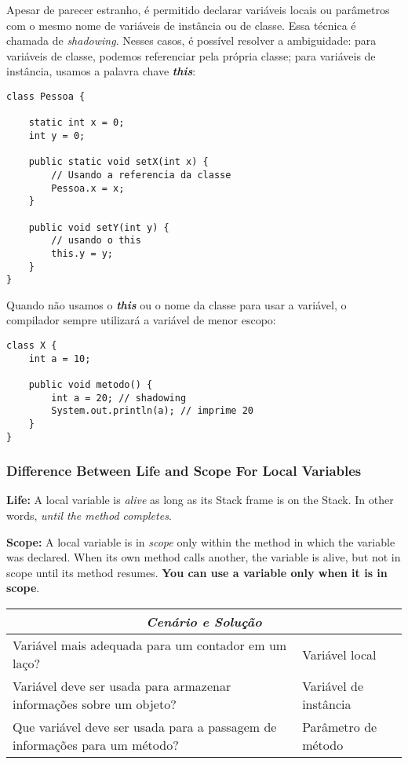 \documentclass[12pt]{article}
\begin{document}
Apesar de parecer estranho, é permitido declarar variáveis locais ou parâmetros com o mesmo nome de variáveis de instância ou de classe. Essa técnica é chamada de \textit{shadowing}. Nesses casos, é possível resolver a ambiguidade: para variáveis de classe, podemos referenciar pela própria classe; para variáveis de instância, usamos a palavra chave \textbf{\textit{this}}:

\begin{lstlisting}
class Pessoa {
	
	static int x = 0;
	int y = 0;
	
	public static void setX(int x) {
		// Usando a referencia da classe
		Pessoa.x = x;
	}
	
	public void setY(int y) {
		// usando o this
		this.y = y;
	}
}
\end{lstlisting}
\pagebreak
Quando não usamos o \textbf{\textit{this}} ou o nome da classe para usar a variável, o compilador sempre utilizará a variável de menor escopo:

\begin{lstlisting}
class X {
	int a = 10;
	
	public void metodo() {
		int a = 20; // shadowing
		System.out.println(a); // imprime 20
	}
}
\end{lstlisting}

\subsubsection{Difference Between Life and Scope For Local Variables}

\textbf{Life:} A local variable is \textit{alive} as long as its Stack frame is on the Stack. In other words, \textit{until the method completes}.

\textbf{Scope:} A local variable is in \textit{scope} only within the method in which the variable was declared. When its own method calls another, the variable is alive, but not in scope until its method resumes. \textbf{You can use a variable only when it is in scope}.


\begin{table}[H]
	\begin{tabular}{|ll|}
		\hline
		\multicolumn{2}{|c|}{\cellcolor[HTML]{34FF34}\textit{\textbf{Cenário e Solução}}}                                        \\ \hline
		\multicolumn{1}{|l|}{Variável mais adequada para um contador em um laço?}                        & Variável local        \\ \hline
		\multicolumn{1}{|l|}{Variável deve ser usada para armazenar informações sobre um objeto?}        & Variável de instância \\ \hline
		\multicolumn{1}{|l|}{Que variável deve ser usada para a passagem de informações para um método?} & Parâmetro de método   \\ \hline
	\end{tabular}
\end{table}
\end{document}
